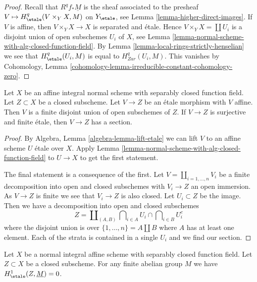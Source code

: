 \begin{proof}
Recall that $R^qf_*\underline{M}$ is the sheaf associated
to the presheaf $V \mapsto H^q_\etale(V \times_Y X, M)$ on $Y_\etale$, see
Lemma \ref{lemma-higher-direct-images}.
If $V$ is affine, then $V \times_Y X \to X$ is separated and \'etale.
Hence $V \times_Y X = \coprod U_i$ is a disjoint union of open
subschemes $U_i$ of $X$, see
Lemma \ref{lemma-normal-scheme-with-alg-closed-function-field}.
By Lemma \ref{lemma-local-rings-strictly-henselian}
we see that $H^q_\etale(U_i, M)$ is equal to
$H^q_{Zar}(U_i, M)$. This vanishes by
Cohomology, Lemma \ref{cohomology-lemma-irreducible-constant-cohomology-zero}.
\end{proof}

\begin{lemma}
\label{lemma-closed-of-affine-normal-scheme-with-alg-closed-function-field}
Let $X$ be an affine integral normal scheme with separably closed
function field. Let $Z \subset X$ be a closed subscheme. Let
$V \to Z$ be an \'etale morphism with $V$ affine. Then $V$ is a finite
disjoint union of open subschemes of $Z$. If $V \to Z$ is
surjective and finite \'etale, then $V \to Z$ has a section.
\end{lemma}

\begin{proof}
By Algebra, Lemma \ref{algebra-lemma-lift-etale}
we can lift $V$ to an affine scheme $U$ \'etale over $X$.
Apply Lemma \ref{lemma-normal-scheme-with-alg-closed-function-field}
to $U \to X$ to get the first statement.

\medskip\noindent
The final statement is a consequence of the first.
Let $V = \coprod_{i = 1, \ldots, n} V_i$ be a finite
decomposition into open and
closed subschemes with $V_i \to Z$ an open immersion.
As $V \to Z$ is finite we see that $V_i \to Z$ is also closed.
Let $U_i \subset Z$ be the image. Then we have a decomposition
into open and closed subschemes
$$
Z =
\coprod\nolimits_{(A, B)}
\bigcap\nolimits_{i \in A} U_i \cap
\bigcap\nolimits_{i \in B} U_i^c
$$
where the disjoint union is over $\{1, \ldots, n\} = A \amalg B$
where $A$ has at least one element.
Each of the strata is contained in a single $U_i$ and
we find our section.
\end{proof}

\begin{lemma}
\label{lemma-gabber-for-h1-absolutely-algebraically-closed}
Let $X$ be a normal integral affine scheme with separably closed
function field. Let $Z \subset X$ be a closed subscheme.
For any finite abelian group $M$ we have $H^1_\etale(Z, \underline{M}) = 0$.
\end{lemma}

